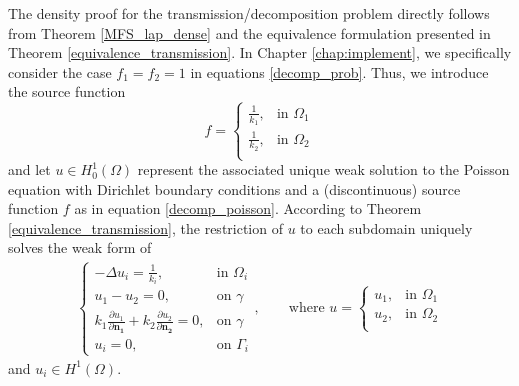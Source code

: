 The density proof for the transmission/decomposition problem directly follows from Theorem \ref{MFS_lap_dense} and the equivalence formulation presented in Theorem \ref{equivalence_transmission}. In Chapter \ref{chap:implement}, we specifically consider the case \(f_1=f_2=1\) in equations \eqref{decomp_prob}. Thus, we introduce the source function
\begin{equation}
    f = \begin{cases}
        \frac{1}{k_1}, & \text{in } \Omega_1\\
        \frac{1}{k_2}, & \text{in } \Omega_2\\
    \end{cases}
\end{equation}
and let \(u \in H^1_0(\Omega)\) represent the associated unique weak solution to the Poisson equation with Dirichlet boundary conditions and a (discontinuous) source function \(f\) as in equation \eqref{decomp_poisson}. According to Theorem \ref{equivalence_transmission}, the restriction of \(u\) to each subdomain uniquely solves the weak form of
\begin{align}\label{transmission_restriction_equations_density}
    \begin{cases}
    - \Delta u_i = \frac{1}{k_i}, & \text{in }\Omega_i\\
    u_1 - u_2 = 0, & \text{on }\gamma\\
    k_1 \frac{\partial u_1}{\partial \mathbf{n_1}} + k_2 \frac{\partial u_2}{\partial  \mathbf{n_2}} = 0, & \text{on }\gamma\\
    u_i = 0, & \text{on }\Gamma_i
    \end{cases}
    ,\qquad
    \text{where } 
    u = \begin{cases}
        u_1, & \text{in } \Omega_1\\
        u_2, & \text{in } \Omega_2\\
    \end{cases}
\end{align}
and \(u_i \in H^1(\Omega)\).

